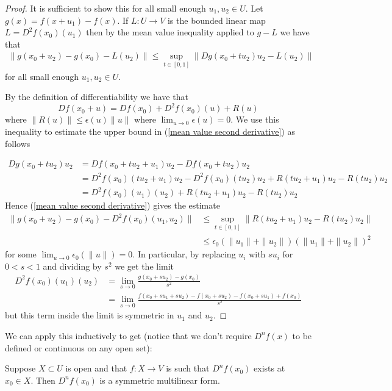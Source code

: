 \documentclass[twoside, a4paper, 10pt]{amsart}
\begin{document}
\begin{proof} It is sufficient to show this for all small enough $u_1, u_2 \in U$. Let $g(x) = f(x + u_1) - f(x)$. If $L:U \to V$ is the bounded linear map $L = D^2f(x_0)(u_1)$ then by the mean value inequality applied to $g - L$ we have that \begin{align}\label{mean value second derivative} \| g(x_0 + u_2) - g(x_0) - L(u_2) \| \leq \sup_{t \in [0,1]} \| Dg(x_0 + tu_2)u_2 - L(u_2) \| \end{align} for all small enough $u_1, u_2 \in U$. 

By the definition of differentiability we have that $$Df(x_0 + u) = Df(x_0) + D^2f(x_0)(u) + R(u) $$ where $\| R(u) \| \leq \epsilon(u)\|u \|$ where $ \lim_{u \to 0} \epsilon(u) = 0$. We use this inequality to estimate the upper bound in (\ref{mean value second derivative}) as follows

\begin{align*} Dg(x_0 + tu_2)u_2 &= Df(x_0 + tu_2 + u_1)u_2 - Df(x_0 +tu_2)u_2 \\
 &= D^2f(x_0) (tu_2 + u_1)u_2 - D^2f(x_0)(tu_2)u_2 + R(tu_2 + u_1)u_2 - R(tu_2)u_2 \\ &= D^2f(x_0)(u_1)(u_2) + R(tu_2 + u_1)u_2 - R(tu_2)u_2  \end{align*} Hence (\ref{mean value second derivative}) gives the estimate \begin{align*} \| g(x_0 + u_2) - g(x_0) - D^2f(x_0)(u_1, u_2) \| & \leq \sup_{t \in [0,1]} \|  R(tu_2 + u_1)u_2 - R(tu_2)u_2 \| \\ & \leq \epsilon_0(\|u_1\| + \|u_2\|) (\|u_1 \| +  \|u_2 \|)^2  \end{align*} for some $\lim_{u \to 0} \epsilon_0(\|u \|) = 0$. In particular, by replacing $u_i$ with $s u_i$ for $0< s < 1$ and dividing by $s^2$ we get the limit \begin{align*} D^2f(x_0)(u_1)(u_2) &= \lim_{s \to 0} \frac{g(x_0 + su_2) - g(x_0)}{s^2} \\ &= \lim_{s \to 0} \frac{f(x_0 + su_1 + su_2) - f(x_0 + su_2) - f(x_0 + su_1) + f(x_0)}{s^2} \end{align*} but this term inside the limit is symmetric in $u_1$ and $u_2$. \end{proof}

We can apply this inductively to get (notice that we don't require $D^nf(x)$ to be defined or continuous on any open set): 
\begin{thm} Suppose $X \subset U$ is open and that $f:X \to V$ is such that $D^nf(x_0)$ exists at $x_0 \in X$. Then $D^nf(x_0)$ is a symmetric multilinear form. \end{thm}
\end{document}
